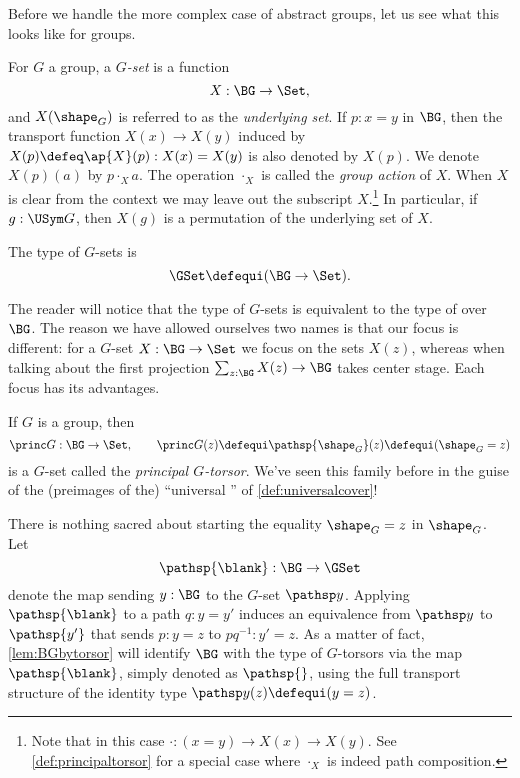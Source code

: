 Before we handle the more complex case of abstract groups,
let us see what this looks like for groups.

\begin{definition}
  For $G$ a group, a \emph{$G$-set} is a function
  $$X : \BG\to\Set,$$
and $X(\shape_G)$ is referred to as the \emph{underlying set}.
If $p:x=y$ in $\BG$, then the transport function $X(x)\to X(y)$ induced
by $X(p)\defeq\ap{X}(p) : X(x)=X(y)$ is also denoted by $X(p)$.
We denote $X(p)(a)$ by $p\cdot_X a$.
The operation $\cdot_X$ is called the \emph{group action} of $X$.
When $X$ is clear from the context we may leave out the
subscript $X$.\footnote{%
Note that in this case $\cdot: (x=y)\to X(x) \to X(y)$.
See \cref{def:principaltorsor} for a special case
where $\cdot_X$ is indeed path composition.}
In particular, if $g:\USym G$,
then $X(g)$ is a permutation of the underlying set of $X$.

The type of $G$-sets is $$\GSet\defequi(\BG\to\Set).$$
\end{definition}
\begin{remark}
  The reader will notice that the type of $G$-sets is equivalent to the
type of \coverings over $\BG$.
The reason we have allowed ourselves two names is that our focus is different: for a $G$-set $X:\BG\to\Set$ we focus on the sets $X(z)$, whereas when talking about \coverings the first projection $\sum_{z:\BG}X(z)\to \BG$ takes center stage.  Each focus has its advantages.
\end{remark}

\begin{example}\label{def:principaltorsor}
  If $G$ is a group, then
$$\princ G:\BG\to\Set,\qquad\princ G(z)\defequi\pathsp{\shape_G}(z)\defequi(\shape_G=z)$$ is a $G$-set called the \emph{principal $G$-torsor}.
We've seen this family before in the guise of the (preimages of the) ``universal \covering'' of \cref{def:universalcover}!

There is nothing sacred about starting the equality $\shape_G = z$ in $\shape_G$.
Let
$$\pathsp{\blank}:\BG\to\GSet$$ denote the map sending $y:\BG$ to the $G$-set $\pathsp y$.
Applying $\pathsp{\blank}$ to a path $q:y=y'$
induces an equivalence from $\pathsp y$ to $\pathsp {y'}$ that sends $p:y=z$ to $pq^{-1}:y'=z$. As a matter of fact, \cref{lem:BGbytorsor} will identify $\BG$ with the type of $G$-torsors via the map $\pathsp{\blank}$, simply denoted as $\pathsp{}$,
using the full transport structure of the identity type $\pathsp y(z)\defequi(y=z)$.
\end{example}

